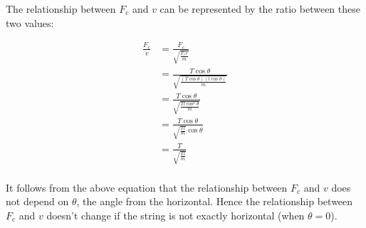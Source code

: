 \documentclass[a4paper,11pt]{article}
\begin{document}
The relationship between $F_c$ and $v$ can be represented by the ratio between
these two values:

\begin{align*}
	\frac{F_c}{v} & = \frac{F_c}{\sqrt{\frac{F_c r}{m}}} \\
	& = \frac{T \cos{\theta}}{\sqrt{\frac{(T \cos{\theta}) (l \cos{\theta})}{m}}} \\
	& = \frac{T \cos{\theta}}{\sqrt{\frac{T l \cos^2{\theta}}{m}}} \\
	& = \frac{T \cos{\theta}}{\sqrt{\frac{T l}{m}} \cos{\theta}} \\
	& = \frac{T}{\sqrt{\frac{T l}{m}}} \\
\end{align*}

It follows from the above equation that the relationship between $F_c$ and $v$
does not depend on $\theta$, the angle from the horizontal. Hence the
relationship between $F_c$ and $v$ doesn't change if the string is not exactly
horizontal (when $\theta = 0$).




\end{document}
